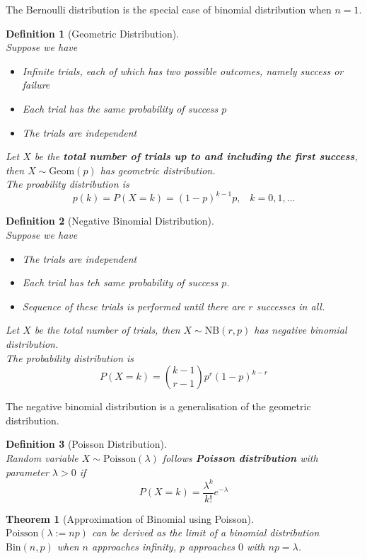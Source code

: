 \documentclass[12pt]{article}
\newcommand{\bin}{\mathrm{Bin}}
\newcommand{\geom}{\mathrm{Geom}}
\newcommand{\Poi}{\mathrm{Poisson}}
\newcommand{\nb}{\mathrm{NB}}
\newtheorem{definition}{Definition}[section]
\newtheorem{theorem}{Theorem}[section]
\theoremstyle{definition}
\begin{document}
The Bernoulli distribution is the special case of binomial distribution when $n=1$.
\begin{definition}[Geometric Distribution]
\hfill\\\normalfont Suppose we have
\begin{itemize}
  \item Infinite trials, each of which has two possible outcomes, namely success or failure
  \item Each trial has the same probability of success $p$
  \item The trials are independent
\end{itemize}
Let $X$ be the \textbf{total number of trials up to and including the first success}, then $X\sim\geom(p)$ has geometric distribution.\\
The proability distribution is
\[
p(k) = P(X=k)=(1-p)^{k-1}p, \;\;\; k=0,1,\ldots
\]
\end{definition}
\begin{definition}[Negative Binomial Distribution]
\hfill\\\normalfont Suppose we have
\begin{itemize}
  \item The trials are independent
  \item Each trial has teh same probability of success $p$.
  \item Sequence of these trials is performed until there are $r$ successes in all.
\end{itemize}
Let $X$ be the total number of trials, then $X\sim \nb(r,p)$ has negative binomial distribution.\\
The probability distribution is
\[
P(X=k) = \binom{k-1}{r-1}p^r(1-p)^{k-r}
\]
\end{definition}
The negative binomial distribution is a generalisation of the geometric distribution.
\begin{definition}[Poisson Distribution]
\hfill\\\normalfont Random variable $X\sim\Poi(\lambda)$ follows \textbf{Poisson distribution} with parameter $\lambda>0$ if
\[
P(X=k) = \frac{\lambda^k}{k!}e^{-\lambda}
\]
\end{definition}
\begin{theorem}[Approximation of Binomial using Poisson]
\hfill\\\normalfont $\Poi(\lambda :=np)$ can be derived as the limit of a binomial distribution $\bin(n,p)$ when $n$ approaches infinity, $p$ approaches $0$ with $np = \lambda$.
\end{theorem}
\end{document}
